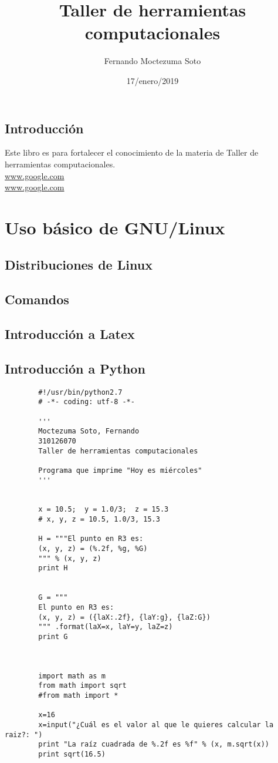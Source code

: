 \documentclass{book}
\title{Taller de herramientas computacionales}
\author{Fernando Moctezuma Soto}
\date{17/enero/2019}
\begin{document}
	
	\maketitle
	\tableofcontents
	\section*{Introducción} Este libro es para fortalecer el conocimiento de la materia de Taller de herramientas computacionales.\\
	\url{www.google.com}\\
	\hyperref[Google]{www.google.com}
	
	\chapter{Uso básico de GNU/Linux}
	\section{Distribuciones de Linux}
	\section{Comandos}
	\section{Introducción a Latex}
	\section{Introducción a Python}
	
	
	\begin{verbatim}
		#!/usr/bin/python2.7
		# -*- coding: utf-8 -*-
		
		'''
		Moctezuma Soto, Fernando
		310126070
		Taller de herramientas computacionales
		
		Programa que imprime "Hoy es miércoles"
		'''
		
		
		x = 10.5;  y = 1.0/3;  z = 15.3
		# x, y, z = 10.5, 1.0/3, 15.3
		
		H = """El punto en R3 es:
		(x, y, z) = (%.2f, %g, %G)
		""" % (x, y, z)
		print H
		
		
		G = """
		El punto en R3 es:
		(x, y, z) = ({laX:.2f}, {laY:g}, {laZ:G})
		""" .format(laX=x, laY=y, laZ=z)
		print G
		
		
		
		import math as m
		from math import sqrt 
		#from math import *
		
		x=16
		x=input("¿Cuál es el valor al que le quieres calcular la raiz?: ")
		print "La raíz cuadrada de %.2f es %f" % (x, m.sqrt(x))
		print sqrt(16.5)
	\end{verbatim}
	
\end{document}
